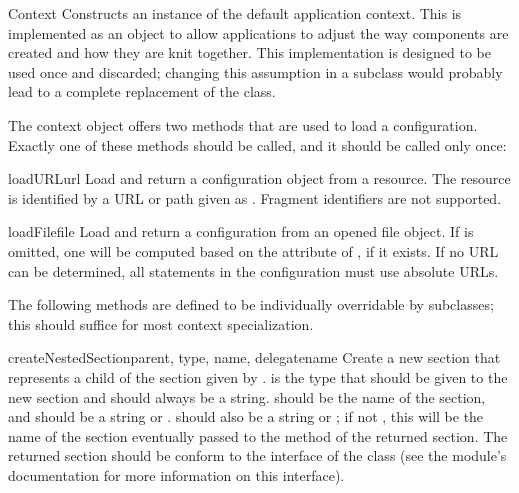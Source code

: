 \documentclass{howto}
\begin{document}
\begin{classdesc}{Context}{}
  Constructs an instance of the default application context.  This is
  implemented as an object to allow applications to adjust the way
  components are created and how they are knit together.  This
  implementation is designed to be used once and discarded; changing
  this assumption in a subclass would probably lead to a complete
  replacement of the class.
\end{classdesc}

The context object offers two methods that are used to load a
configuration.  Exactly one of these methods should be called, and it
should be called only once:

\begin{methoddesc}{loadURL}{url}
  Load and return a configuration object from a resource.  The
  resource is identified by a URL or path given as .
  Fragment identifiers are not supported.
\end{methoddesc}

\begin{methoddesc}{loadFile}{file}
  Load and return a configuration from an opened file object.
  If  is omitted, one will be computed based on the
   attribute of , if it exists.  If no URL can
  be determined, all  statements in the configuration
  must use absolute URLs.
\end{methoddesc}

The following methods are defined to be individually overridable by
subclasses; this should suffice for most context specialization.

\begin{methoddesc}{createNestedSection}{parent, type, name, delegatename}
  Create a new section that represents a child of the section given by
  .   is the type that should be given to the
  new section and should always be a string.   should be the
  name of the section, and should be a string or .
   should also be a string or ; if not
  , this will be the name of the section eventually passed
  to the  method of the returned section.  The
  returned section should be conform to the interface of the
   class (see the 
  module's documentation for more information on this interface).
\end{methoddesc}
\end{document}
